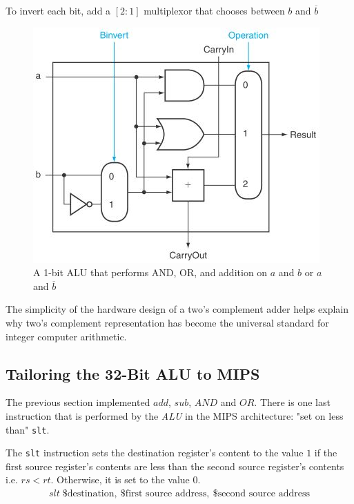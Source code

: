 \documentclass[10pt,a4paper]{article}
\begin{document}
To invert each bit, add a $[2:1]$ multiplexor that chooses between $b$ and $\overline{b}$ \par
\begin{figure} [h!]
    \centering
    \includegraphics[scale=0.7]{ALU subtract.JPG}
    \caption{A 1-bit ALU that performs AND, OR, and addition on $a$ and $b$ or $a$ and $\overline{b}$}
\end{figure}

\pagebreak

The simplicity of the hardware design of a two’s complement adder helps explain why two’s complement
representation has become the universal standard for integer computer arithmetic.

\subsection{Tailoring the 32-Bit ALU to MIPS}

The previous section implemented $add$, $sub$, $AND$ and $OR$. There is one last instruction that is
performed by the \textit{ALU} in the MIPS architecture: "set on less than" \texttt{slt}.

The \texttt{slt} instruction sets the destination register's content to the value $1$ if the first source
register's contents are less than the second source register's contents i.e. $rs < rt$. Otherwise, it is set to the
value 0.
\begin{align*}
    slt \; \$\text{destination}, \: \$ \text{first source address}, \: \$\text{second source address}
\end{align*}
\end{document}
